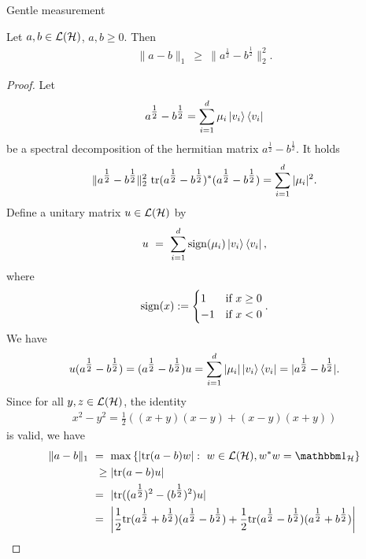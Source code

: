 \begin{subsubsection}{Gentle measurement}
     \begin{lemma}
      Let $a,b \in {\mathcal L}({\mathcal H})$, $a, b \geq 0$. Then
      \begin{align}
       \|a - b \|_1 \ \geq \ \|a^{\tfrac{1}{2}} - b^{\tfrac{1}{2}}\|_2^2.
      \end{align}
     \end{lemma}
     \begin{proof}
      Let 
      \begin{align}
        a^{\tfrac{1}{2}} - b^{\tfrac{1}{2}} = \sum_{i=1}^d \mu_i \ket{v_i}\bra{v_i}
      \end{align}
      be a spectral decomposition of the hermitian matrix $a^{\tfrac{1}{2}} - b^{\tfrac{1}{2}}$. It holds
      \begin{align}
       \|a^{\tfrac{1}{2}} - b^{\tfrac{1}{2}}\|_2^2  \ \tr(a^{\tfrac{1}{2}} - b^{\tfrac{1}{2}})^\ast(a^{\tfrac{1}{2}} - b^{\tfrac{1}{2}}) = \sum_{i=1}^d |\mu_i|^2.
      \end{align}
      Define a unitary matrix $u \in {\mathcal L}({\mathcal H})$ by 
      \begin{align}
       u \ = \ \sum_{i=1}^d \mathrm{sign}(\mu_i) \ket{v_i} \bra{v_i},
      \end{align}
      where 
      \begin{align}
       \mathrm{sign}(x) := \begin{cases} 1  & \text{if} \ x \geq 0 \\ -1& \text{if} \ x < 0 \end{cases}.
      \end{align}
      We have
      \begin{align}
       u(a^{\tfrac{1}{2}} - b^{\tfrac{1}{2}}) = (a^{\tfrac{1}{2}} - b^{\tfrac{1}{2}})u = \sum_{i=1}^d |\mu_i| \ket{v_i}\bra{v_i} = |a^{\tfrac{1}{2}} - b^{\tfrac{1}{2}}|.
      \end{align}
      Since for all $y, z \in {\mathcal L}({\mathcal H})$, the identity
      \begin{align}
       x^2 - y^2 = \frac{1}{2}\left((x+y)(x-y)+(x-y)(x+y) \right)
      \end{align}
      is valid, we have
      \begin{align}
       \|a - b\|_1 
       \ & = \ \max\left\{|\tr (a-b)w|: \ w \in \cL(\cH), w^\ast w = \bbmeins_\cH \right\} \\
       \ &  \ \geq |\tr (a-b)u| \\
       \ & = \ |\tr ((a^{\tfrac{1}{2}})^2-(b^{\tfrac{1}{2}})^2)u| \\
       \ & = \ \left|\frac{1}{2} \tr(a^{\tfrac{1}{2}} + b^{\tfrac{1}{2}})(a^{\tfrac{1}{2}} - b^{\tfrac{1}{2}}) + \frac{1}{2} \tr(a^{\tfrac{1}{2}} - b^{\tfrac{1}{2}})(a^{\tfrac{1}{2}} + b^{\tfrac{1}{2}})\right| \\

\end{align}
\end{proof}
\end{subsubsection}
